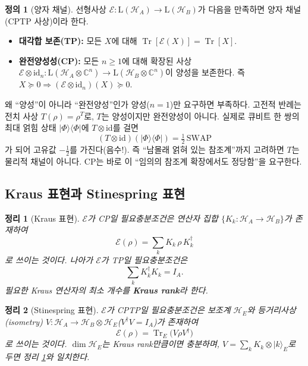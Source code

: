 \documentclass[11pt,a4paper]{article}
\newcommand{\E}{\mathcal{E}}
\newcommand{\Hcal}{\mathcal{H}}
\newcommand{\Tr}{\operatorname{Tr}}
\newcommand{\id}{\mathrm{id}}
\newcommand{\Lin}{\mathrm{L}}
\theoremstyle{definition}
\newtheorem{definition}{정의}[section]
\theoremstyle{plain}
\newtheorem{theorem}{정리}[section]
\theoremstyle{remark}
\begin{document}
\begin{definition}[양자 채널]
선형사상 $\E:\Lin(\Hcal_A)\to\Lin(\Hcal_B)$가 다음을 만족하면 양자 채널(CPTP 사상)이라 한다.
\begin{itemize}[leftmargin=1.6em]
  \item \textbf{대각합 보존(TP):} 모든 $X$에 대해 $\Tr[\E(X)]=\Tr[X]$.
  \item \textbf{완전양성성(CP):} 모든 $n\ge1$에 대해 확장된 사상 $\E\otimes\id_n:\Lin(\Hcal_A\otimes\mathbb C^n)\to\Lin(\Hcal_B\otimes\mathbb C^n)$이 양성을 보존한다. 즉 $X\succeq0\Rightarrow(\E\otimes\id_n)(X)\succeq0$.
\end{itemize}
\end{definition}

\begin{mathbox}{왜 ``양성''이 아니라 ``완전양성''인가}
양성($n=1$)만 요구하면 부족하다. 고전적 반례는 전치 사상 $T(\rho)=\rho^T$로, $T$는 양성이지만 완전양성이 아니다. 실제로 큐비트 한 쌍의 최대 얽힘 상태 $|\Phi\rangle\langle\Phi|$에 $T\otimes\id$를 걸면
\[
(T\otimes\id)(|\Phi\rangle\langle\Phi|)=\tfrac12\,\mathrm{SWAP}
\]
가 되어 고유값 $-\tfrac12$를 가진다(음수!). 즉 ``남몰래 얽혀 있는 참조계''까지 고려하면 $T$는 물리적 채널이 아니다. CP는 바로 이 ``임의의 참조계 확장에서도 정당함''을 요구한다.
\end{mathbox}

\subsection{Kraus 표현과 Stinespring 표현}

\begin{theorem}[Kraus 표현]\label{thm:kraus}
$\E$가 CP일 필요충분조건은 연산자 집합 $\{K_k:\Hcal_A\to\Hcal_B\}$가 존재하여
\[
\E(\rho)=\sum_k K_k\,\rho\,K_k^\dagger
\]
로 쓰이는 것이다. 나아가 $\E$가 TP일 필요충분조건은
\[
\sum_k K_k^\dagger K_k=I_A .
\]
필요한 Kraus 연산자의 최소 개수를 \textbf{Kraus rank}라 한다.
\end{theorem}

\begin{theorem}[Stinespring 표현]\label{thm:stinespring}
$\E$가 CPTP일 필요충분조건은 보조계 $\Hcal_E$와 등거리사상(isometry) $V:\Hcal_A\to\Hcal_B\otimes\Hcal_E$($V^\dagger V=I_A$)가 존재하여
\[
\E(\rho)=\Tr_E\!\big(V\rho V^\dagger\big)
\]
로 쓰이는 것이다. $\dim\Hcal_E$는 Kraus rank만큼이면 충분하며, $V=\sum_k K_k\otimes|k\rangle_E$로 두면 정리 \ref{thm:kraus}와 일치한다.
\end{theorem}
\end{document}
